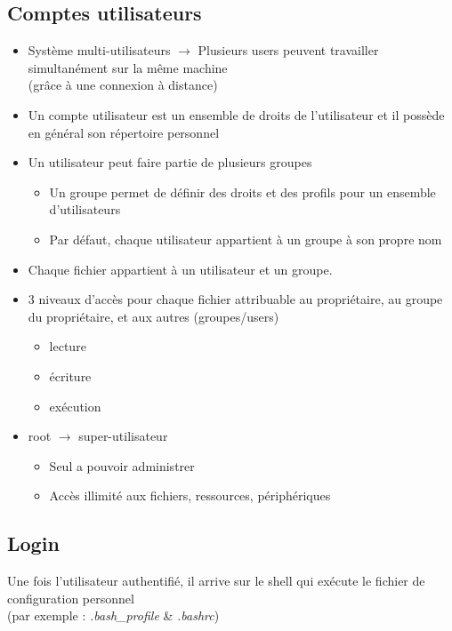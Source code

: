 \documentclass[a4paper]{article}
\begin{document}
  \subsection{Comptes utilisateurs}
  \begin{itemize}[label=\textbullet, font=\Large]
    \item Système multi-utilisateurs $\rightarrow$ Plusieurs users peuvent travailler simultanément sur la même machine\\ (grâce à une connexion à distance)
    \item Un compte utilisateur est un ensemble de droits de l'utilisateur et il possède en général son répertoire personnel
    \item Un utilisateur peut faire partie de plusieurs groupes
    \begin{itemize}[label=, font=\scriptsize]
      \item Un groupe permet de définir des droits et des profils pour un ensemble d'utilisateurs
      \item Par défaut, chaque utilisateur appartient à un groupe à son propre nom
    \end{itemize}
    \item Chaque fichier appartient à un utilisateur et un groupe.
    \item 3 niveaux d'accès pour chaque fichier attribuable au propriétaire, au groupe du propriétaire, et aux autres (groupes/users)
    \begin{itemize}[label=, font=\scriptsize]
      \item lecture
      \item écriture
      \item exécution
    \end{itemize}
    \item root $\rightarrow$ super-utilisateur
    \begin{itemize}[label=, font=\scriptsize]
      \item Seul a pouvoir administrer
      \item Accès illimité aux fichiers, ressources, périphériques
    \end{itemize}
  \end{itemize}

    \subsection{Login}
    Une fois l'utilisateur authentifié, il arrive sur le shell qui exécute le fichier de configuration personnel\\ (par exemple : \emph{.bash\_profile} \& \emph{.bashrc})
\end{document}
